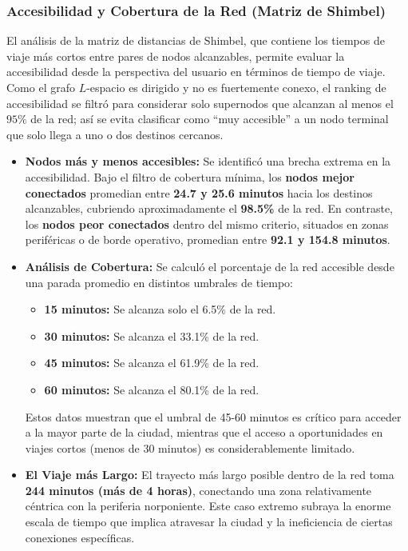         \subsubsection{Accesibilidad y Cobertura de la Red (Matriz de Shimbel)}
            El análisis de la matriz de distancias de Shimbel, que contiene los tiempos de viaje más cortos entre pares de nodos alcanzables, permite evaluar la accesibilidad desde la perspectiva del usuario en términos de tiempo de viaje. Como el grafo \(L\)-espacio es dirigido y no es fuertemente conexo, el ranking de accesibilidad se filtró para considerar solo supernodos que alcanzan al menos el \(95\%\) de la red; así se evita clasificar como ``muy accesible'' a un nodo terminal que solo llega a uno o dos destinos cercanos.
            \begin{itemize}
                \item \textbf{Nodos más y menos accesibles:} Se identificó una brecha extrema en la accesibilidad. Bajo el filtro de cobertura mínima, los \textbf{nodos mejor conectados} promedian entre \textbf{24.7 y 25.6 minutos} hacia los destinos alcanzables, cubriendo aproximadamente el \textbf{98.5\%} de la red. En contraste, los \textbf{nodos peor conectados} dentro del mismo criterio, situados en zonas periféricas o de borde operativo, promedian entre \textbf{92.1 y 154.8 minutos}.
                \item \textbf{Análisis de Cobertura:} Se calculó el porcentaje de la red accesible desde una parada promedio en distintos umbrales de tiempo:
                \begin{itemize}
                    \item \textbf{15 minutos:} Se alcanza solo el 6.5\% de la red.
                    \item \textbf{30 minutos:} Se alcanza el 33.1\% de la red.
                    \item \textbf{45 minutos:} Se alcanza el 61.9\% de la red.
                    \item \textbf{60 minutos:} Se alcanza el 80.1\% de la red.
                \end{itemize}
                Estos datos muestran que el umbral de 45-60 minutos es crítico para acceder a la mayor parte de la ciudad, mientras que el acceso a oportunidades en viajes cortos (menos de 30 minutos) es considerablemente limitado.
                \item \textbf{El Viaje más Largo:} El trayecto más largo posible dentro de la red toma \textbf{244 minutos (más de 4 horas)}, conectando una zona relativamente céntrica con la periferia norponiente. Este caso extremo subraya la enorme escala de tiempo que implica atravesar la ciudad y la ineficiencia de ciertas conexiones específicas.
            \end{itemize}

